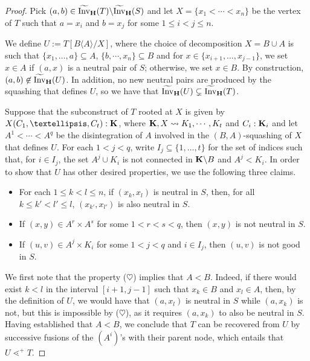 \documentclass[10pt,a4paper]{amsart}
\newcommand{\Invt}{\widetilde{\mathrm{Inv}}}
\begin{document}
\begin{proof}
 Pick $(a,b)\in \Invt_{\bf H}(T)\backslash \Invt_{\bf H}(S)$ and let $X=\{x_1<\cdots <x_n\}$ be the vertex of $T$ such that $a=x_i$ and $b=x_j$ for some $1\leq i<j\leq n$. 

 

We define $U:=T[B\langle A\rangle /X]$, 
 where the choice of decomposition $X=B\cup A$ is such that $\{x_1,\dots,a\}\subseteq A$, $\{b,\cdots,x_n\}\subseteq B$ and for $x\in \{x_{i+1},\dots,x_{j-1}\}$, we set $x\in A$ if $(a,x)$ is a neutral pair of $S$; otherwise, we set $x\in B$. By construction, $(a,b)\not\in \Invt_{\bf H}(U)$. In addition, no new neutral pairs are produced by the squashing that defines $U$, so we have that $\Invt_{\bf H}(U)\subsetneq \Invt_{\bf H}(T)$. 

\smallskip

Suppose that the subconstruct of $T$ rooted at $X$ is given by $X(C_1,\dots,C_t):{\bf K}$, where ${\bf K},X\leadsto K_1,\cdots ,K_t$ and $C_i:{\bf K}_i$ and let $A^1<\cdots <A^q$ be the disintegration of $A$ involved in the $(B,A)$-squashing of $X$ that defines $U$. For each $1<j<q$, write $I_j\subseteq \{1,\dots,t\}$ for the set of indices such that, for $i\in I_j$, the set $A^j\cup K_i$ is not connected in ${\bf K}\backslash B$ and $A^j<K_i$. In order to show that $U$ has other desired properties, we use the following three claims.
\begin{itemize}
\item[($\heartsuit$)] For each $1\leq k<l\leq n$, if $(x_k,x_l)$ is neutral in $S$, then, for all $k\leq k' < l' \leq l$, $(x_{k'},x_{l'})$ is also neutral in $S$.
\item[($\clubsuit$)] If $(x,y)\in A^r\times A^s$ for some $1<r<s<q$, then $(x,y)$ is not neutral in $S$.
\item[($\spadesuit$)] If $(u,v)\in A^j\times K_i$ for some $1<j<q$ and $i\in I_j$, then $(u,v)$ is not good in $S$.
\end{itemize}
 
We first note that the property ($\heartsuit$) implies that $A<B$. Indeed, if there would exist $k<l$ in the interval $[i+1,j-1]$ such that $x_k\in B$ and $x_l\in A$, then, by the definition of $U$, we would have that $(a,x_l)$ is neutral in $S$ while $(a,x_k)$ is not, but this is impossible by ($\heartsuit$), as it requires $(a,x_k)$ to also be neutral in $S$. Having established that $A<B$, we conclude that $T$ can be recovered from $U$ by successive fusions of the $(A^i)$'s with their parent node, which entails that $U\lessdot^{+} T$.


\end{proof}
\end{document}
